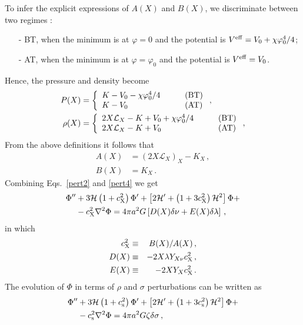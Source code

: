 \documentclass[twocolumn,showpacs, nofootinbib,aps,superscriptaddress, eqsecnum,prd,prl,notitlepage,showkeys,10pt,reprint]{revtex4-1}
\begin{document}
%
To infer the explicit expressions of $A(X)$ and $B(X)$, we discriminate between two regimes \cite{2012CRPhy..13..566M}:
%
\begin{itemize}
%
\item[-] BT, when the minimum is at $\varphi=0$ and the potential is $V^{\rm eff}=V_0+\chi \varphi_0^4/4$;
%
\item[-] AT, when the minimum is at $\varphi=\varphi_0$ and the potential is $V^{\rm eff}=V_0$.
%
\end{itemize}
%
Hence, the pressure and density become
%
\begin{align}
\label{s8}
P(X)&= \left\{
\begin{array}{ll}
K-V_0-\chi \varphi_0^4/4\quad &\quad{\rm (BT)}\\
K-V_0\quad&\quad{\rm (AT)}
\end{array}
\right.,\\
\label{s8bisaaa}
\rho(X)&= \left\{
\begin{array}{ll}
2X\mathcal{L}_X-K+V_0+\chi \varphi_0^4/4\quad &\quad{\rm (BT)}\\
2X\mathcal{L}_X-K+V_0\quad&\quad{\rm (AT)}
\end{array}
\right.,
\end{align}
%
From the above definitions it follows that
%
\begin{align}
\label{pert5a}
A(X)&= \left(2X\mathcal{L}_X\right)_X-K_X\,,\\
\label{pert5b}
B(X)&= K_X\,.
\end{align}
%
Combining Eqs.~\eqref{pert2} and \eqref{pert4} we get
%
\begin{align}
\nonumber
\Phi^{\prime\prime}&+3\mathcal{H}\left(1+c_{\rm X}^2\right)\Phi^\prime+\left[2\mathcal{H}^\prime+\left(1+3c_{\rm X}^2\right)\mathcal{H}^2\right]\Phi+\\
\label{pert7}
&-c_{\rm X}^2\nabla^2\Phi=4\pi a^2G\left[D(X)\delta\nu+E(X)\delta\lambda\right]\,,
\end{align}
%
in which
%
\begin{eqnarray}
c_{\rm X}^2&\equiv& B(X)/A(X)\,,\\
D(X)&\equiv&-2X\lambda Y_{X\nu}c_{\rm X}^2\,,\\
E(X)&\equiv& -2XY_Xc_{\rm X}^2\,.
\end{eqnarray}
%
The evolution of $\Phi$ in terms of $\rho$ and $\sigma$ perturbations can be written as \cite{1999PhLB..458..219G}
%
\begin{align}
\nonumber
\Phi^{\prime\prime}&+3\mathcal{H}\left(1+c_{\rm s}^2\right)\Phi^\prime+\left[2\mathcal{H}^\prime+\left(1+3c_{\rm s}^2\right)\mathcal{H}^2\right]\Phi+\\
\label{pert8}
&-c_{\rm s}^2\nabla^2\Phi=4\pi a^2G\zeta\delta\sigma\,,
\end{align}
\end{document}
